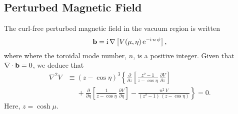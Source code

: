 \documentclass[12pt,prb,aps,notitlepage]{revtex4-1}
\begin{document}
\subsection{Perturbed Magnetic Field}
The curl-free perturbed magnetic field in the vacuum region is written
\begin{equation}
{\bf b} = {\rm i}\,\nabla \left[V(\mu,\eta)\,{\rm e}^{-{\rm i}\,n\,\phi}\right],
\end{equation}
where where the toroidal mode number, $n$, is a positive integer. Given that $\nabla\cdot{\bf b}=0$, we deduce that 
\begin{align}\label{e6}
\nabla^2 V &\equiv (z-\cos\eta)^3\left\{\frac{\partial}{\partial z}\!\left[\frac{z^2-1}{z-\cos\eta}\,\frac{\partial V}{\partial z}\right]\right.\nonumber\\[0.5ex]
&\left.\phantom{=}+\frac{\partial}{\partial \eta}\!\left[\frac{1}{z-\cos\eta}\,\frac{\partial V}{\partial\eta}\right]
-\frac{n^2\,V}{(z^2-1)\,(z-\cos\eta)}\right\}=0.
\end{align}
Here, $z=\cosh\mu$. 
\end{document}
